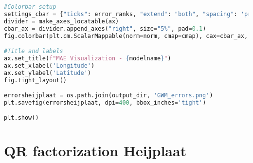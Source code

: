 \begin{lstlisting}[language=Python]
#Colorbar setup
settings_cbar = {"ticks": error_ranks, "extend": "both", "spacing": 'proportional', "label": "MAE"}
divider = make_axes_locatable(ax)
cbar_ax = divider.append_axes("right", size="5%", pad=0.1)
fig.colorbar(plt.cm.ScalarMappable(norm=norm, cmap=cmap), cax=cbar_ax, **settings_cbar)

#Title and labels
ax.set_title(f"MAE Visualization - {modelname}")
ax.set_xlabel('Longitude')
ax.set_ylabel('Latitude')
fig.tight_layout()

errorsheijplaat = os.path.join(output_dir, 'GWM_errors.png')
plt.savefig(errorsheijplaat, dpi=400, bbox_inches='tight')

plt.show()
\end{lstlisting}

\section{QR factorization Heijplaat}
